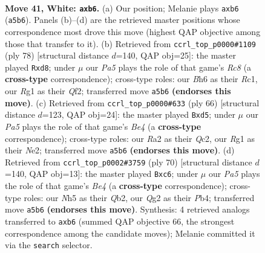 \documentclass[11pt]{article}
\begin{document}
\clearpage

\begin{figure}[p]\centering
\begin{subfigure}{0.46\textwidth}\centering
\resizebox{\linewidth}{!}{%
\newchessgame
\chessboard[
  setfen={2b1k3/p1qn1r1p/1r3b1B/P4P1N/1p1p4/1p6/R3P1Q1/1N1K2R1 w - - 4 41},
  showmover=false,
  pgfstyle=straightmove, color=movearrow, markmove={a5-b6}
]}
\caption{}
\end{subfigure}\hfill
\begin{subfigure}{0.46\textwidth}\centering
\resizebox{\linewidth}{!}{%
\newchessgame
\chessboard[
  setfen={b1Rrr1k1/5pp1/Bp1q2n1/3p4/1P1N3p/P6P/5QP1/2R3K1 w - - 3 40},
  showmover=false,
  pgfstyle=straightmove, color=movearrow, markmove={c8-d8}
]}
\caption{}
\end{subfigure}
\\[4pt]
\begin{subfigure}{0.46\textwidth}\centering
\resizebox{\linewidth}{!}{%
\newchessgame
\chessboard[
  setfen={6rk/1p4b1/p3q2p/P2r3n/1P2BPp1/R6P/2Q1N2K/4B3 w - - 1 34},
  showmover=false,
  pgfstyle=straightmove, color=movearrow, markmove={e4-d5}
]}
\caption{}
\end{subfigure}\hfill
\begin{subfigure}{0.46\textwidth}\centering
\resizebox{\linewidth}{!}{%
\newchessgame
\chessboard[
  setfen={2r3k1/1b3r1p/1pnqp1p1/4p1B1/1PP1B3/4R2P/1Q4P1/2R3K1 w - - 3 36},
  showmover=false,
  pgfstyle=straightmove, color=movearrow, markmove={e4-c6}
]}
\caption{}
\end{subfigure}
\caption{\textbf{Move 41, White: \texttt{axb6}.} (a) Our position; Melanie plays \texttt{axb6} (\texttt{a5b6}). Panels (b)--(d) are the retrieved master positions whose correspondence most drove this move (highest QAP objective among those that transfer to it). (b) Retrieved from \texttt{ccrl\_top\_p0000\#1109} (ply 78) [structural distance $d$=140, QAP obj=25]: the master played \texttt{Rxd8}; under $\mu$ our \emph{Pa5} plays the role of that game's \emph{Rc8} (a \textbf{cross-type} correspondence); cross-type roles: our \emph{B}h6 as their \emph{R}c1, our \emph{R}g1 as their \emph{Q}f2; transferred move \texttt{a5b6} \textbf{(endorses this move)}. (c) Retrieved from \texttt{ccrl\_top\_p0000\#633} (ply 66) [structural distance $d$=123, QAP obj=24]: the master played \texttt{Bxd5}; under $\mu$ our \emph{Pa5} plays the role of that game's \emph{Be4} (a \textbf{cross-type} correspondence); cross-type roles: our \emph{R}a2 as their \emph{Q}c2, our \emph{R}g1 as their \emph{N}e2; transferred move \texttt{a5b6} \textbf{(endorses this move)}. (d) Retrieved from \texttt{ccrl\_top\_p0002\#3759} (ply 70) [structural distance $d$=140, QAP obj=13]: the master played \texttt{Bxc6}; under $\mu$ our \emph{Pa5} plays the role of that game's \emph{Be4} (a \textbf{cross-type} correspondence); cross-type roles: our \emph{N}h5 as their \emph{Q}b2, our \emph{Q}g2 as their \emph{P}b4; transferred move \texttt{a5b6} \textbf{(endorses this move)}. Synthesis: 4 retrieved analogs transferred to \texttt{axb6} (summed QAP objective 66, the strongest correspondence among the candidate moves); Melanie committed it via the \texttt{search} selector.}
\label{fig:thought-m80}
\end{figure}
\end{document}
